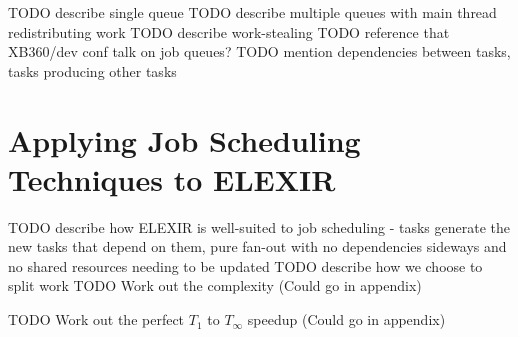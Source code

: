 TODO describe single queue
TODO describe multiple queues with main thread redistributing work
TODO describe work-stealing
TODO reference that XB360/dev conf talk on job queues?
TODO mention dependencies between tasks, tasks producing other tasks

\section{Applying Job Scheduling Techniques to ELEXIR}

TODO describe how ELEXIR is well-suited to job scheduling - tasks generate the new tasks that depend on them, pure fan-out with no dependencies sideways and no shared resources needing to be updated
TODO describe how we choose to split work
TODO Work out the complexity (Could go in appendix)

TODO Work out the perfect $T_1$ to $T_\infty$ speedup (Could go in appendix)
